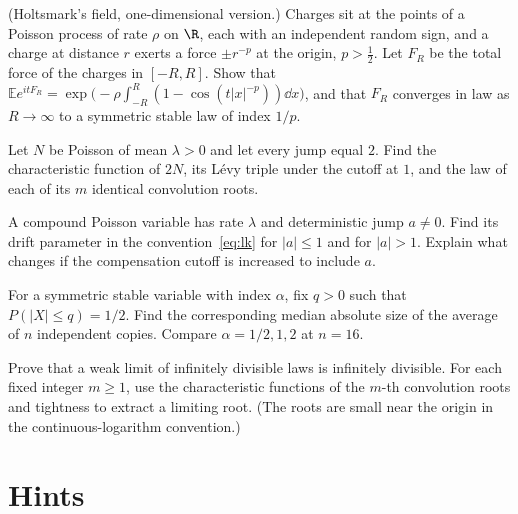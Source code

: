 \begin{exercise}[$\star\star\star$]\label{ex:holtsmark}
(Holtsmark's field, one-dimensional version.) Charges sit at the points of a Poisson process of rate $\rho$ on $\R$, each with an independent random sign, and a
charge at distance $r$ exerts a force $\pm r^{-p}$ at the origin, $p>\frac12$. Let $F_R$ be the total force of the charges in $[-R,R]$. Show that
$\mathbb Ee^{itF_R}=\exp\bigl(-\rho\int_{-R}^R(1-\cos(t|x|^{-p}))\dd x\bigr)$, and that $F_R$ converges in law as $R\to\infty$ to a symmetric stable law of index $1/p$.
\end{exercise}

\begin{exercise}[$\star$]\label{ex:v11-ch05-poisson-jump}
Let $N$ be Poisson of mean $\lambda>0$ and let every jump equal $2$. Find the characteristic function of $2N$, its L\'evy triple under the cutoff at $1$, and the law of each of its $m$ identical convolution roots.
\end{exercise}

\begin{exercise}[$\star\star$]\label{ex:v11-ch05-drift}
A compound Poisson variable has rate $\lambda$ and deterministic jump $a\ne0$. Find its drift parameter in the convention~\eqref{eq:lk} for $|a|\le1$ and for $|a|>1$. Explain what changes if the compensation cutoff is increased to include $a$.
\end{exercise}

\begin{exercise}[$\star\star$]\label{ex:v11-ch05-quantile}
For a symmetric stable variable with index $\alpha$, fix $q>0$ such that $P(|X|\le q)=1/2$. Find the corresponding median absolute size of the average of $n$ independent copies. Compare $\alpha=1/2,1,2$ at $n=16$.
\end{exercise}

\begin{exercise}[$\star\star\star$]\label{ex:v11-ch05-closure}
Prove that a weak limit of infinitely divisible laws is infinitely divisible. For each fixed integer $m\ge1$, use the characteristic functions of the $m$-th convolution roots and tightness to extract a limiting root. (The roots are small near the origin in the continuous-logarithm convention.)
\end{exercise}

\section{Hints}

